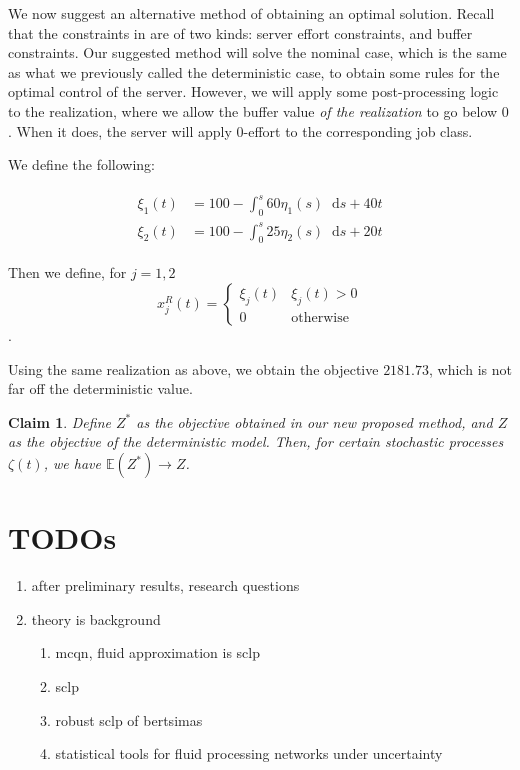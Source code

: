 \documentclass[11pt,a4paper,titlepage]{article}
\newcommand*{\dd}{\ensuremath{\mathop{}\!\mathrm{d}}}%
\theoremstyle{definition}
\theoremstyle{plain}
\newtheorem{claim}{Claim}
\begin{document}
We now suggest an alternative method of obtaining an optimal solution.
Recall that the constraints in 
are of two kinds:
server effort constraints,
and buffer constraints.
Our suggested method will solve the nominal case,
which is the same as what we previously called the deterministic case,
to obtain some rules for the optimal control of the server.
However,
we will apply some post-processing logic to the realization,
where we allow the buffer value \textit{of the realization}
to go below $0$.
When it does,
the server will apply $0$-effort to the corresponding job class.

We define the following:

\begin{align}
\begin{split}
    \xi_1(t) & = 100 - \int_0^s 60 \eta_1(s) \dd s  + 40t \\
    \xi_2(t) & = 100 - \int_0^s 25 \eta_2(s) \dd s  + 20t
\end{split}
\end{align}

Then we define, for $j=1,2$
\begin{equation}
    x_j^R(t) =
    \begin{cases}
        \xi_j(t) & \xi_j(t) > 0 \\
        0 & \text{otherwise}
    \end{cases}
\end{equation}.

Using the same realization as above,
we obtain the objective $2181.73$,
which is not far off the deterministic value.

\begin{claim}
    Define $Z^*$ as the objective obtained in our new proposed method,
    and $Z$ as the objective of the deterministic model.
    Then,
    for certain stochastic processes $\zeta(t)$,
    we have $\mathbb{E}(Z^*) \to Z$.
\end{claim}


\section{TODOs}

\begin{enumerate}
    \item after preliminary results, research questions
    \item theory is background
    \begin{enumerate}
        \item mcqn, fluid approximation is sclp
        \item sclp
        \item robust sclp of bertsimas
        \item statistical tools for fluid processing networks under uncertainty
    \end{enumerate}
\end{enumerate}

\clearpage
\printbibliography
\label{sec:bibliography}
\end{document}
